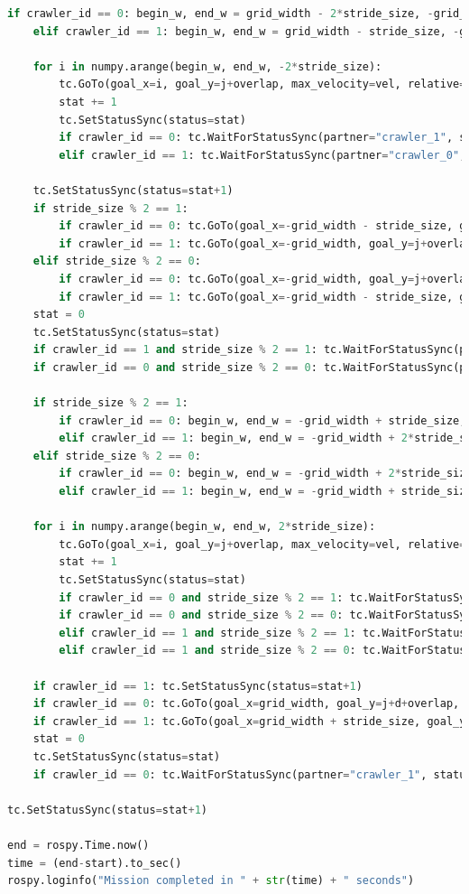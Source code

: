 \documentclass[francais,RandD]{rapportPFE}
\begin{document}
\begin{lstlisting}[language=Python,caption={Implémentation de l'algorithme de ski nordique},label=lst:ski_nordique]
	if crawler_id == 0: begin_w, end_w = grid_width - 2*stride_size, -grid_width - 1 - stride_size
	elif crawler_id == 1: begin_w, end_w = grid_width - stride_size, -grid_width - 1 - stride_size

	for i in numpy.arange(begin_w, end_w, -2*stride_size):
		tc.GoTo(goal_x=i, goal_y=j+overlap, max_velocity=vel, relative=False)
		stat += 1
		tc.SetStatusSync(status=stat)
		if crawler_id == 0: tc.WaitForStatusSync(partner="crawler_1", status=stat+1)
		elif crawler_id == 1: tc.WaitForStatusSync(partner="crawler_0", status=stat)

	tc.SetStatusSync(status=stat+1)
	if stride_size % 2 == 1:
		if crawler_id == 0: tc.GoTo(goal_x=-grid_width - stride_size, goal_y=j+overlap, max_velocity=vel, relative=False)
		if crawler_id == 1: tc.GoTo(goal_x=-grid_width, goal_y=j+overlap, max_velocity=vel, relative=False)
	elif stride_size % 2 == 0:
		if crawler_id == 0: tc.GoTo(goal_x=-grid_width, goal_y=j+overlap, max_velocity=vel, relative=False)
		if crawler_id == 1: tc.GoTo(goal_x=-grid_width - stride_size, goal_y=j+overlap, max_velocity=vel, relative=False)
	stat = 0
	tc.SetStatusSync(status=stat)
	if crawler_id == 1 and stride_size % 2 == 1: tc.WaitForStatusSync(partner="crawler_0", status=stat+1)
	if crawler_id == 0 and stride_size % 2 == 0: tc.WaitForStatusSync(partner="crawler_1", status=stat+1)

	if stride_size % 2 == 1:
		if crawler_id == 0: begin_w, end_w = -grid_width + stride_size, grid_width + 1 + stride_size
		elif crawler_id == 1: begin_w, end_w = -grid_width + 2*stride_size, grid_width + 1 + stride_size
	elif stride_size % 2 == 0:
		if crawler_id == 0: begin_w, end_w = -grid_width + 2*stride_size, grid_width + 1 + stride_size
		elif crawler_id == 1: begin_w, end_w = -grid_width + stride_size, grid_width + 1 + stride_size

	for i in numpy.arange(begin_w, end_w, 2*stride_size):
		tc.GoTo(goal_x=i, goal_y=j+overlap, max_velocity=vel, relative=False)
		stat += 1
		tc.SetStatusSync(status=stat)
		if crawler_id == 0 and stride_size % 2 == 1: tc.WaitForStatusSync(partner="crawler_1", status=stat)
		if crawler_id == 0 and stride_size % 2 == 0: tc.WaitForStatusSync(partner="crawler_1", status=stat+1)
		elif crawler_id == 1 and stride_size % 2 == 1: tc.WaitForStatusSync(partner="crawler_0", status=stat+1)
		elif crawler_id == 1 and stride_size % 2 == 0: tc.WaitForStatusSync(partner="crawler_0", status=stat)

	if crawler_id == 1: tc.SetStatusSync(status=stat+1)
	if crawler_id == 0: tc.GoTo(goal_x=grid_width, goal_y=j+d+overlap, max_velocity=vel, relative=False)
	if crawler_id == 1: tc.GoTo(goal_x=grid_width + stride_size, goal_y=j+d+overlap, max_velocity=vel, relative=False)
	stat = 0
	tc.SetStatusSync(status=stat)
	if crawler_id == 0: tc.WaitForStatusSync(partner="crawler_1", status=stat+1)

tc.SetStatusSync(status=stat+1)

end = rospy.Time.now()
time = (end-start).to_sec()
rospy.loginfo("Mission completed in " + str(time) + " seconds")

		\end{lstlisting}
\end{document}
